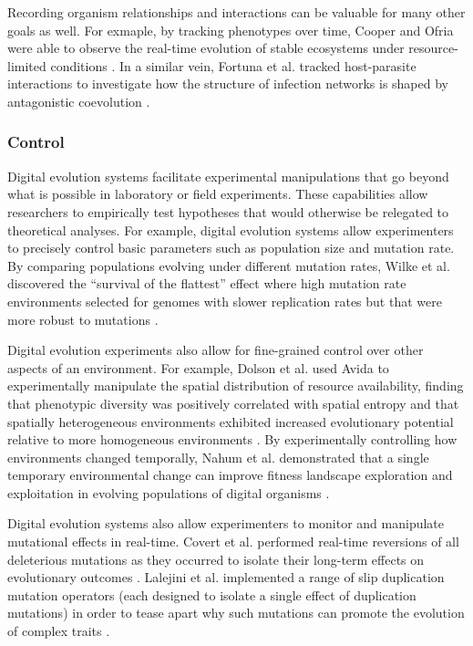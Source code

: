 Recording organism relationships and interactions can be valuable for many other goals as well.
For exmaple, by tracking phenotypes over time, Cooper and Ofria were able to observe the real-time evolution of stable ecosystems under resource-limited conditions \citep{cooper_evolution_2002}.
In a similar vein, Fortuna et al. tracked host-parasite interactions to investigate how the structure of infection networks is shaped by antagonistic coevolution \citep{fortuna_coevolutionary_2019}.


\subsubsection{Control}

Digital evolution systems facilitate experimental manipulations that go beyond what is possible in laboratory or field experiments.
These capabilities allow researchers to empirically test hypotheses that would otherwise be relegated to theoretical analyses.
For example, digital evolution systems allow experimenters to precisely control basic parameters such as population size and mutation rate.
By comparing populations evolving under different mutation rates, Wilke et al. discovered the ``survival of the flattest'' effect where high mutation rate environments selected for genomes with slower replication rates but that were more robust to mutations \citep{wilke_flattest_2001}. 


Digital evolution experiments also allow for fine-grained control over other aspects of an environment.
For example, Dolson et al. used Avida to experimentally manipulate the spatial distribution of resource availability, finding that phenotypic diversity was positively correlated with spatial entropy and that spatially heterogeneous environments exhibited increased evolutionary potential relative to more homogeneous environments \citep{dolson_spatial_2017}.
By experimentally controlling how environments changed temporally, Nahum et al. demonstrated that a single temporary environmental change can improve fitness landscape exploration and exploitation in evolving populations of digital organisms \citep{nahum_improved_2017}.

Digital evolution systems also allow experimenters to monitor and manipulate mutational effects in real-time.
Covert et al. performed real-time reversions of all deleterious mutations as they occurred to isolate their long-term effects on evolutionary outcomes \citep{covert_experiments_2013}.
Lalejini et al. implemented a range of slip duplication mutation operators (each designed to isolate a single effect of duplication mutations) in order to tease apart why such mutations can promote the evolution of complex traits \citep{lalejini_gene_2017}.

